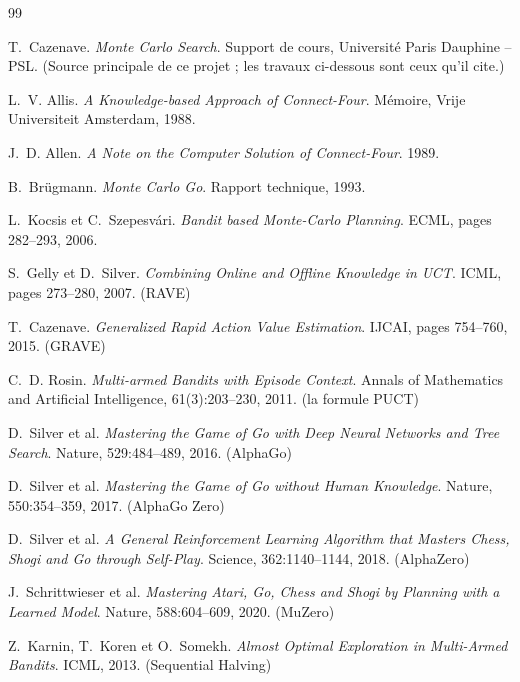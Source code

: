 \documentclass[11pt,a4paper]{article}
\begin{document}
\begin{thebibliography}{99}
\footnotesize\setlength{\itemsep}{0pt}\setlength{\parskip}{0pt}

 T.~Cazenave.
  \emph{Monte Carlo Search}. Support de cours, Université Paris Dauphine -- PSL.
  (Source principale de ce projet ; les travaux ci-dessous sont ceux qu'il cite.)

 L.~V. Allis.
  \emph{A Knowledge-based Approach of Connect-Four}.
  Mémoire, Vrije Universiteit Amsterdam, 1988.

 J.~D. Allen.
  \emph{A Note on the Computer Solution of Connect-Four}. 1989.

 B.~Brügmann.
  \emph{Monte Carlo Go}. Rapport technique, 1993.

 L.~Kocsis et C.~Szepesvári.
  \emph{Bandit based Monte-Carlo Planning}. ECML, pages 282--293, 2006.

 S.~Gelly et D.~Silver.
  \emph{Combining Online and Offline Knowledge in UCT}. ICML, pages 273--280, 2007.
  (RAVE)

 T.~Cazenave.
  \emph{Generalized Rapid Action Value Estimation}. IJCAI, pages 754--760, 2015.
  (GRAVE)

 C.~D. Rosin.
  \emph{Multi-armed Bandits with Episode Context}.
  Annals of Mathematics and Artificial Intelligence, 61(3):203--230, 2011.
  (la formule PUCT)

 D.~Silver et al.
  \emph{Mastering the Game of Go with Deep Neural Networks and Tree Search}.
  Nature, 529:484--489, 2016. (AlphaGo)

 D.~Silver et al.
  \emph{Mastering the Game of Go without Human Knowledge}.
  Nature, 550:354--359, 2017. (AlphaGo Zero)

 D.~Silver et al.
  \emph{A General Reinforcement Learning Algorithm that Masters Chess, Shogi and Go
  through Self-Play}. Science, 362:1140--1144, 2018. (AlphaZero)

 J.~Schrittwieser et al.
  \emph{Mastering Atari, Go, Chess and Shogi by Planning with a Learned Model}.
  Nature, 588:604--609, 2020. (MuZero)

 Z.~Karnin, T.~Koren et O.~Somekh.
  \emph{Almost Optimal Exploration in Multi-Armed Bandits}. ICML, 2013.
  (Sequential Halving)


\end{thebibliography}
\end{document}

